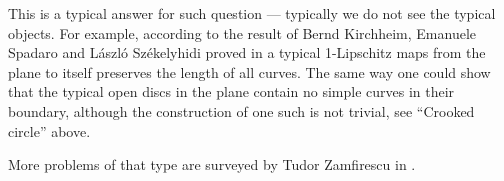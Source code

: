 This is a typical answer for such question --- typically we do not see the typical objects.
For example, according to the result of 
Bernd Kirchheim, 
Emanuele Spadaro  
and 
L{\'a}szl{\'o} Sz{\'e}kelyhidi proved in \cite{KSS}
a typical 1-Lipschitz maps from the plane to itself preserves the length of all curves.
The same way one could show that the typical open discs in the plane contain no simple curves in their boundary, 
although the construction of one such is not trivial, 
see ``Crooked circle'' above.

More problems of that type are surveyed by Tudor Zamfirescu in \cite{zamfirescu}.







